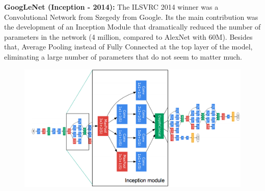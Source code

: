 \vspace{-1cm}
\textbf{GoogLeNet (Inception - 2014):} The ILSVRC 2014 winner was a Convolutional Network from Szegedy from Google. Its the main contribution was the development of an Inception Module that dramatically reduced the number of parameters in the network (4 million, compared to AlexNet with 60M). Besides that, Average Pooling instead of Fully Connected at the top layer of the model, eliminating a large number of parameters that do not seem to matter much.
\begin{center}
  \begin{figure}[H]
  \centering
  \includegraphics[width=1\columnwidth]{images/chap2/GoogleNet1.png}
  \label{chap2:WSP}
  \end{figure}
\end{center}

\vspace{-1cm}

